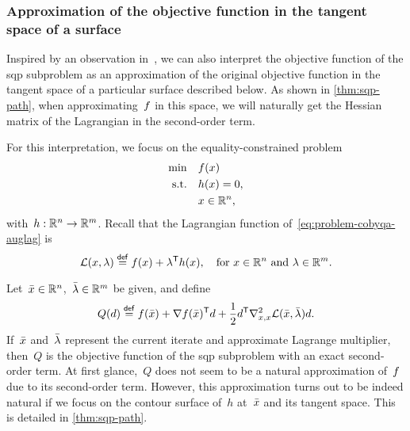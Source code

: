 \subsubsection{Approximation of the objective function in the tangent space of a surface}

Inspired by an observation in~\cite[\S~2]{Gill_Wong_2011}, we can also interpret the objective function of the \gls{sqp} subproblem as an approximation of the original objective function in the tangent space of a particular surface described below.
As shown in \cref{thm:sqp-path}, when approximating~$f$ in this space, we will naturally get the Hessian matrix of the Lagrangian in the second-order term.

For this interpretation, we focus on the equality-constrained problem
\begin{subequations}
    \label{eq:problem-cobyqa-auglag}
    \begin{align}
        \min        & \quad \obj(\iter)\\
        \text{s.t.} & \quad h(\iter) = 0,\\
                    & \quad \iter \in \R^n, \nonumber
    \end{align}
\end{subequations}
with~$h : \mathbb{R}^n \to \mathbb{R}^m$.
Recall that the Lagrangian function of~\cref{eq:problem-cobyqa-auglag} is
\begin{equation*}
    \lag(\iter, \lm) \eqdef \obj(\iter) + \lm^{\T} h(\iter), \quad \text{for~$\iter \in \R^n$ and~$\lm \in \R^m$.}
\end{equation*}

Let~$\bar{\iter} \in \R^n$,~$\bar{\lm} \in \R^m$ be given, and define
\begin{equation*}
    Q(\step) \eqdef \obj(\bar{\iter}) + \nabla \obj(\bar{\iter})^{\T} \step + \frac{1}{2} \step^{\T} \nabla_{x, x}^2 \lag(\bar{\iter}, \bar{\lm}) \step.
\end{equation*}
If~$\bar{\iter}$ and~$\bar{\lm}$ represent the current iterate and approximate Lagrange multiplier, then~$Q$ is the objective function of the \gls{sqp} subproblem with an exact second-order term.
At first glance,~$Q$ does not seem to be a natural approximation of~$f$ due to its second-order term.
However, this approximation turns out to be indeed natural if we focus on the contour surface of~$h$ at~$\bar{\iter}$ and its tangent space.
This is detailed in \cref{thm:sqp-path}.

